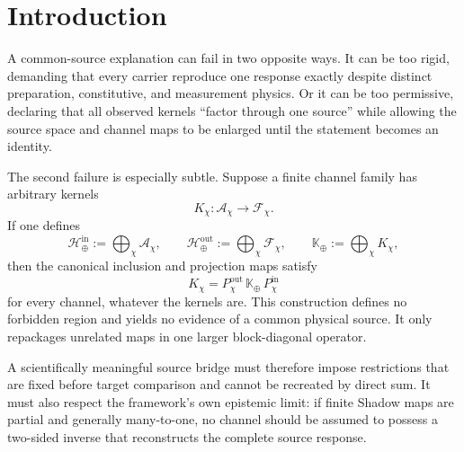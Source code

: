\documentclass[11pt]{article}
\begin{document}
\section{Introduction}

A common-source explanation can fail in two opposite ways. It can be too rigid, demanding that every carrier reproduce one response exactly despite distinct preparation, constitutive, and measurement physics. Or it can be too permissive, declaring that all observed kernels ``factor through one source'' while allowing the source space and channel maps to be enlarged until the statement becomes an identity.

The second failure is especially subtle. Suppose a finite channel family has arbitrary kernels
\begin{equation}
K_{\chi}:\mathcal A_{\chi}\longrightarrow\mathcal F_{\chi}.
\end{equation}
If one defines
\begin{equation}
\mathcal H^{\mathrm{in}}_{\oplus}
:=\bigoplus_{\chi}\mathcal A_{\chi},
\qquad
\mathcal H^{\mathrm{out}}_{\oplus}
:=\bigoplus_{\chi}\mathcal F_{\chi},
\qquad
\mathbb K_{\oplus}:=\bigoplus_{\chi}K_{\chi},
\label{eq:trivial_direct_sum}
\end{equation}
then the canonical inclusion and projection maps satisfy
\begin{equation}
K_{\chi}
=P^{\mathrm{out}}_{\chi}\,
 \mathbb K_{\oplus}\,
 P^{\mathrm{in}}_{\chi}
\end{equation}
for every channel, whatever the kernels are. This construction defines no forbidden region and yields no evidence of a common physical source. It only repackages unrelated maps in one larger block-diagonal operator.

A scientifically meaningful source bridge must therefore impose restrictions that are fixed before target comparison and cannot be recreated by direct sum. It must also respect the framework's own epistemic limit: if finite Shadow maps are partial and generally many-to-one, no channel should be assumed to possess a two-sided inverse that reconstructs the complete source response.
\end{document}

